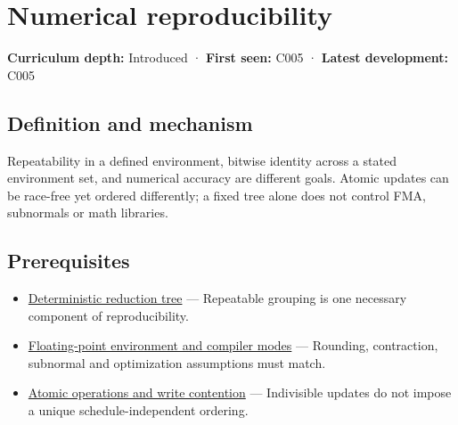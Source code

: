 \hypertarget{appendix-5f1a2c3f97ff}{}\label{referencestart:appendix-5f1a2c3f97ff}
\section{Numerical reproducibility}\label{appendix-5f1a2c3f97ff-numerical-reproducibility}

\hypertarget{appendix-5f1a2c3f97ff-numerical-reproducibility}{}

\textbf{Curriculum depth:} Introduced · \textbf{First seen:} C005 · \textbf{Latest development:} C005

\begin{allmightroledefinition}

\subsection{Definition and mechanism}\label{appendix-5f1a2c3f97ff-definition-and-mechanism}

\hypertarget{appendix-5f1a2c3f97ff-definition-and-mechanism}{}

Repeatability in a defined environment, bitwise identity across a stated environment set, and numerical accuracy are different goals. Atomic updates can be race-free yet ordered differently; a fixed tree alone does not control FMA, subnormals or math libraries.

\end{allmightroledefinition}

\subsection{Prerequisites}\label{appendix-5f1a2c3f97ff-prerequisites}

\hypertarget{appendix-5f1a2c3f97ff-prerequisites}{}

\begin{itemize}
\tightlist
\item
  \hyperref[appendix-4c8e0238e7ee]{Deterministic reduction tree} --- Repeatable grouping is one necessary component of reproducibility.
\item
  \hyperref[appendix-f11d1a521253]{Floating-point environment and compiler modes} --- Rounding, contraction, subnormal and optimization assumptions must match.
\item
  \hyperref[appendix-e12d1b03fefb]{Atomic operations and write contention} --- Indivisible updates do not impose a unique schedule-independent ordering.
\end{itemize}


